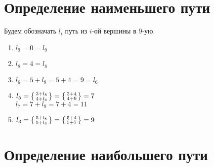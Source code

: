 \section{Определение наименьшего пути}

Будем обозначать $l_i$ путь из $i$-ой вершины в 9-ую.

\begin{enumerate}
	\item[$A_7$\ ] $l_9 = 0 = l_9$
	\item[$A_6$\ ] $l_8 = 4 = l_8$
	\item[$A_5$\ ] $l_6 = 5 + l_8 = 5 + 4 = 9 = l_6$
	\item[$A_4$\ ] $l_5 = \left\{ \begin{smallmatrix} 3 + l_8 \\ 4 + l_6 \end{smallmatrix} \right\} = \left\{ \begin{smallmatrix} 3 + 4 \\ 4 + 9 \end{smallmatrix} \right\} = 7$\\
	$l_7 = 7 + l_8 = 7 + 4 = 11$
	\item[$A_3$\ ] $l_3 = \left\{ \begin{smallmatrix} 5 + l_8 \\ 5 + l_5 \end{smallmatrix} \right\} = \left\{ \begin{smallmatrix} 5 + 4 \\ 5 + 7 \end{smallmatrix} \right\} = 9$
\end{enumerate}

\section{Определение наибольшего пути}

